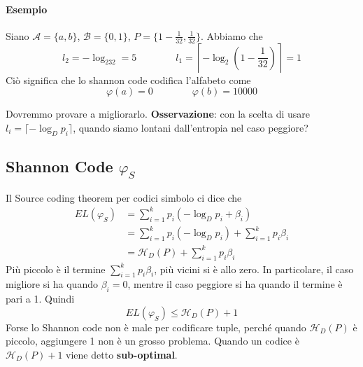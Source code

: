 \paragraph{Esempio} Siano $\mathcal{A}=\{a,b\}$, $\mathcal{B}=\{0,1\}$, $P=\{1-\frac{1}{32},\frac{1}{32}\}$. Abbiamo che
$$
    l_2 = -\log_232 = 5 \qquad\qquad l_1 = \left\lceil -\log_2\left(1-\frac{1}{32}\right)\right\rceil = 1
$$
Ciò significa che lo shannon code codifica l'alfabeto come
$$
    \varphi(a) = 0 \qquad\qquad \varphi(b) = 10000
$$
\begin{center}
\end{center}
Dovremmo provare a migliorarlo. \textbf{Osservazione}: con la scelta di usare $l_i=\lceil-\log_Dp_i\rceil$, quando siamo lontani dall'entropia nel caso peggiore?


\subsection{Shannon Code $\varphi_S$}
Il Source coding theorem per codici simbolo ci dice che
\begin{align*}
    EL(\varphi_S) &= \sum_{i=1}^k p_i(-\log_Dp_i+\beta_i)\\
    &= \sum_{i=1}^k p_i(-\log_Dp_i) + \sum_{i=1}^k p_i\beta_i\\
    &= \mathcal{H}_D(P) + \sum_{i=1}^k p_i\beta_i
\end{align*}
Più piccolo è il termine $\sum_{i=1}^k p_i\beta_i$, più vicini si è allo zero. In particolare, il caso migliore si ha quando $\beta_i=0$, mentre il caso peggiore si ha quando il termine è pari a 1. Quindi 
$$
    EL(\varphi_S) \leq \mathcal{H}_D(P) + 1
$$
Forse lo Shannon code non è male per codificare tuple, perché quando $\mathcal{H}_D(P)$ è piccolo, aggiungere 1 non è un grosso problema. Quando un codice è $\mathcal{H}_D(P) + 1$ viene detto \textbf{sub-optimal}.\medskip

